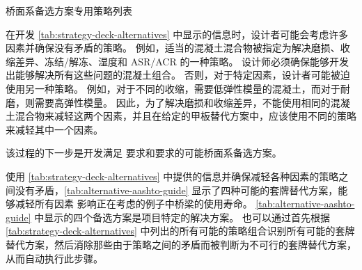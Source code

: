 \begin{table}
  \caption{桥面系备选方案专用策略列表}\label{tab:strategy-deck-alternatives}
\end{table}


在开发 \cref{tab:strategy-deck-alternatives} 中显示的信息时，设计者可能会考虑许多因素并确保没有矛盾的策略。 例如，适当的混凝土混合物被指定为解决磨损、收缩差异、冻结/解冻、湿度和 ASR/ACR 的一种策略。 设计师必须确保能够开发出能够解决所有这些问题的混凝土组合。 否则，对于特定因素，设计者可能被迫使用另一种策略。 例如，对于不同的收缩，需要低弹性模量的混凝土，而对于耐磨，则需要高弹性模量。 因此，为了解决磨损和收缩差异，不能使用相同的混凝土混合物来减轻这两个因素，并且在给定的甲板替代方案中，应该使用不同的策略来减轻其中一个因素。

该过程的下一步是开发满足 \lrfd 要求和要求的可能桥面系备选方案。

使用 \cref{tab:strategy-deck-alternatives} 中提供的信息并确保减轻各种因素的策略之间没有矛盾，\cref{tab:alternative-aashto-guide} 显示了四种可能的套牌替代方案，能够减轻所有因素 影响正在考虑的例子中桥梁的使用寿命。 \cref{tab:alternative-aashto-guide} 中显示的四个备选方案是项目特定的解决方案。 也可以通过首先根据 \cref{tab:strategy-deck-alternatives} 中列出的所有可能的策略组合识别所有可能的套牌替代方案，然后消除那些由于策略之间的矛盾而被判断为不可行的套牌替代方案，从而自动执行此步骤。

